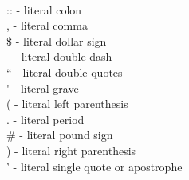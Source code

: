 \\
:: - literal colon\\
, - literal comma\\
\$ - literal dollar sign\\
- - literal double-dash\\
`` - literal double quotes\\
\'{} - literal grave\\
( - literal left parenthesis\\
. - literal period\\
\# - literal pound sign\\
) - literal right parenthesis\\
' - literal single quote or apostrophe\\




